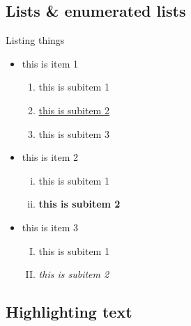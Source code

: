 \documentclass{beamer}
\begin{document}
\subsection{Lists \& enumerated lists}
\begin{frame}[t]{Listing things}
    \begin{itemize}
        \item this is item 1
        \begin{enumerate}
            \item this is subitem 1
            \item \underline{this is subitem 2}
            \item \alert{this is subitem 3}
        \end{enumerate} 
        \pause
        \item this is item 2
        \begin{enumerate}[(i)]
            \item {\color{red} this is subitem 1}
            \item \bf{this is subitem 2}
        \end{enumerate} 
        \item this is item 3
        \pause
        \begin{enumerate}[(I)]
            \item {\color{green} this is subitem 1}
            \item \it{this is subitem 2}
        \end{enumerate} 
    \end{itemize}
\end{frame}

\subsection{Highlighting text}
\end{document}
